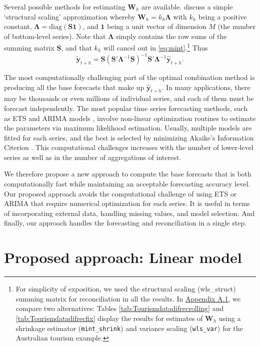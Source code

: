 \documentclass[11pt,a4paper,]{article}
\begin{document}
Several possible methods for estimating \(\bm{W}_{h}\) are available. \textcite{mint2018} discuss a simple `structural scaling' approximation whereby \(\bm{W}_{h} = k_{h} \bm{\Lambda}\) with \(k_{h}\) being a positive constant, \(\bm{\Lambda} = \text{diag}(\bm{S}\bm{1})\), and \(\bm{1}\) being a unit vector of dimension \(M\) (the number of bottom-level series). Note that \(\bm{\Lambda}\) simply contains the row sums of the summing matrix \(\bm{S}\), and that \(k_{h}\) will cancel out in \eqref{eq:mint}.\footnote{For simplicity of exposition, we used the structural scaling (wls\_struct) summing matrix for reconciliation in all the results. In \protect\hyperlink{appendixA.1}{Appendix A.1}, we compare two alternatives: Tables \ref{tab:Tourismdatadifrecrolling} and \ref{tab:Tourismdatadifrecfix} display the results for estimates of \(\bm{W}_h\) using a shrinkage estimator (\texttt{mint\_shrink}) and variance scaling (\texttt{wls\_var}) for the Australian tourism example.} Thus
\begin{equation}\label{eq:mint2}
  \tilde{\bm{y}}_{t+h}=\bm{S}(\bm{S}'\bm{\Lambda}^{-1}\bm{S})^{-1}\bm{S}'\bm{\Lambda}^{-1}\hat{\bm{y}}_{t+h}.
\end{equation}

The most computationally challenging part of the optimal combination method is producing all the base forecasts that make up \(\hat{\bm{y}}_{t+h}\). In many applications, there may be thousands or even millions of individual series, and each of them must be forecast independently. The most popular time series forecasting methods, such as ETS and ARIMA models \autocite{fpp2} , involve non-linear optimization routines to estimate the parameters via maximum likelihood estimation. Usually, multiple models are fitted for each series, and the best is selected by minimizing Akaike's Information Citerion \autocite{akaike1998information}. This computational challenges increases with the number of lower-level series as well as in the number of aggregations of interest.

We therefore propose a new approach to compute the base forecasts that is both computationally fast while maintaining an acceptable forecasting accuracy level. Our proposed approach avoids the computational challenge of using ETS or ARIMA that require numerical optimization for each series. It is useful in terms of incorporating external data, handling missing values, and model selection. And finally, our approach handles the forecasting and reconciliation in a single step.

\hypertarget{proposed-approach-linear-model}{%
\section{\texorpdfstring{Proposed approach: Linear model \label{sec:proposedapproach1}}{Proposed approach: Linear model }}\label{proposed-approach-linear-model}}
\end{document}
